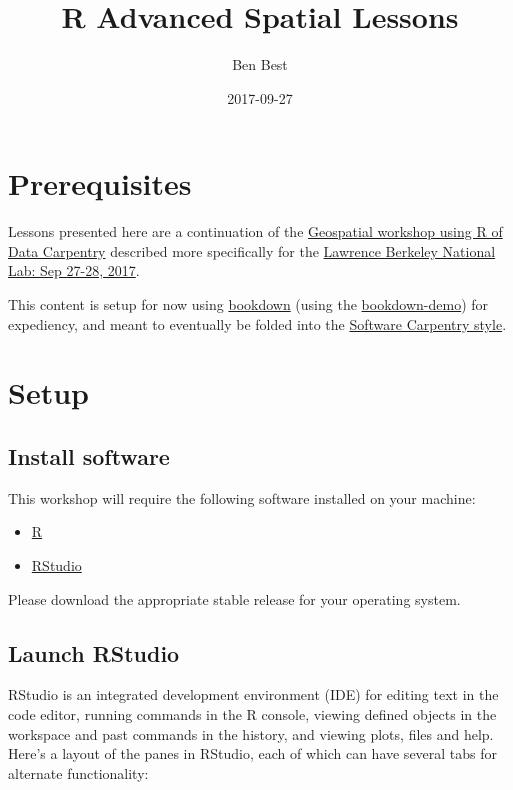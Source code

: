 \documentclass[]{book}
\title{R Advanced Spatial Lessons}
\author{Ben Best}
\date{2017-09-27}
\providecommand{\tightlist}{%
  \setlength{\itemsep}{0pt}\setlength{\parskip}{0pt}}
\theoremstyle{definition}
\theoremstyle{definition}
\theoremstyle{definition}
\theoremstyle{remark}
\begin{document}
\maketitle

{
\setcounter{tocdepth}{1}
\tableofcontents
}
\chapter*{Prerequisites}\label{prereq}

Lessons presented here are a continuation of the
\href{http://www.datacarpentry.org/lessons/\#geospatial-data-workshop}{Geospatial
workshop using R of Data Carpentry} described more specifically for the
\href{https://jsta.github.io/2017-09-27-LBNL/}{Lawrence Berkeley
National Lab: Sep 27-28, 2017}.

This content is setup for now using
\href{http://bookdown.org/yihui/bookdown}{bookdown} (using the
\href{https://github.com/rstudio/bookdown-demo}{bookdown-demo}) for
expediency, and meant to eventually be folded into the
\href{https://github.com/swcarpentry/styles}{Software Carpentry style}.

\chapter*{Setup}\label{setup}

\section{Install software}\label{install-software}

This workshop will require the following software installed on your
machine:

\begin{itemize}
\tightlist
\item
  \href{http://cran.cnr.berkeley.edu/}{R}
\item
  \href{https://www.rstudio.com/products/rstudio/download/\#download}{RStudio}
\end{itemize}

Please download the appropriate stable release for your operating
system.

\section{Launch RStudio}\label{launch-rstudio}

RStudio is an integrated development environment (IDE) for editing text
in the code editor, running commands in the R console, viewing defined
objects in the workspace and past commands in the history, and viewing
plots, files and help. Here's a layout of the panes in RStudio, each of
which can have several tabs for alternate functionality:
\end{document}
